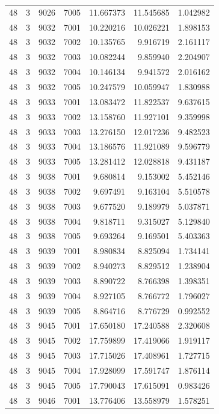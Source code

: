 \begin{table}
\begin{tabular}{rrrrrrr}
48 & 3 & 9026 & 7005 & 11.667373 & 11.545685 & 1.042982 \\
48 & 3 & 9032 & 7001 & 10.220216 & 10.026221 & 1.898153 \\
48 & 3 & 9032 & 7002 & 10.135765 & 9.916719 & 2.161117 \\
48 & 3 & 9032 & 7003 & 10.082244 & 9.859940 & 2.204907 \\
48 & 3 & 9032 & 7004 & 10.146134 & 9.941572 & 2.016162 \\
48 & 3 & 9032 & 7005 & 10.247579 & 10.059947 & 1.830988 \\
48 & 3 & 9033 & 7001 & 13.083472 & 11.822537 & 9.637615 \\
48 & 3 & 9033 & 7002 & 13.158760 & 11.927101 & 9.359998 \\
48 & 3 & 9033 & 7003 & 13.276150 & 12.017236 & 9.482523 \\
48 & 3 & 9033 & 7004 & 13.186576 & 11.921089 & 9.596779 \\
48 & 3 & 9033 & 7005 & 13.281412 & 12.028818 & 9.431187 \\
48 & 3 & 9038 & 7001 & 9.680814 & 9.153002 & 5.452146 \\
48 & 3 & 9038 & 7002 & 9.697491 & 9.163104 & 5.510578 \\
48 & 3 & 9038 & 7003 & 9.677520 & 9.189979 & 5.037871 \\
48 & 3 & 9038 & 7004 & 9.818711 & 9.315027 & 5.129840 \\
48 & 3 & 9038 & 7005 & 9.693264 & 9.169501 & 5.403363 \\
48 & 3 & 9039 & 7001 & 8.980834 & 8.825094 & 1.734141 \\
48 & 3 & 9039 & 7002 & 8.940273 & 8.829512 & 1.238904 \\
48 & 3 & 9039 & 7003 & 8.890722 & 8.766398 & 1.398351 \\
48 & 3 & 9039 & 7004 & 8.927105 & 8.766772 & 1.796027 \\
48 & 3 & 9039 & 7005 & 8.864716 & 8.776729 & 0.992552 \\
48 & 3 & 9045 & 7001 & 17.650180 & 17.240588 & 2.320608 \\
48 & 3 & 9045 & 7002 & 17.759899 & 17.419066 & 1.919117 \\
48 & 3 & 9045 & 7003 & 17.715026 & 17.408961 & 1.727715 \\
48 & 3 & 9045 & 7004 & 17.928099 & 17.591747 & 1.876114 \\
48 & 3 & 9045 & 7005 & 17.790043 & 17.615091 & 0.983426 \\
48 & 3 & 9046 & 7001 & 13.776406 & 13.558979 & 1.578251 \\

\end{tabular}
\end{table}
